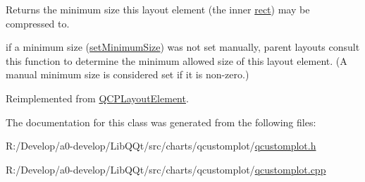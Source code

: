 Returns the minimum size this layout element (the inner \mbox{\hyperlink{class_q_c_p_layout_element_a208effccfe2cca4a0eaf9393e60f2dd4}{rect}}) may be compressed to.

if a minimum size (\mbox{\hyperlink{class_q_c_p_layout_element_a5dd29a3c8bc88440c97c06b67be7886b}{set\+Minimum\+Size}}) was not set manually, parent layouts consult this function to determine the minimum allowed size of this layout element. (A manual minimum size is considered set if it is non-\/zero.) 

Reimplemented from \mbox{\hyperlink{class_q_c_p_layout_element_ab3fdb5c9a5189bb2dac10d4d25329cd8}{Q\+C\+P\+Layout\+Element}}.



The documentation for this class was generated from the following files\+:\begin{DoxyCompactItemize}
\item 
R\+:/\+Develop/a0-\/develop/\+Lib\+Q\+Qt/src/charts/qcustomplot/\mbox{\hyperlink{qcustomplot_8h}{qcustomplot.\+h}}\item 
R\+:/\+Develop/a0-\/develop/\+Lib\+Q\+Qt/src/charts/qcustomplot/\mbox{\hyperlink{qcustomplot_8cpp}{qcustomplot.\+cpp}}\end{DoxyCompactItemize}
